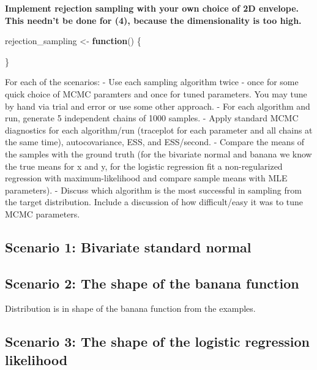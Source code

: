 \documentclass[
]{article}
\newenvironment{Shaded}{\begin{snugshade}}{\end{snugshade}}
\newcommand{\ControlFlowTok}[1]{\textcolor[rgb]{0.13,0.29,0.53}{\textbf{#1}}}
\newcommand{\NormalTok}[1]{#1}
\newcommand{\OtherTok}[1]{\textcolor[rgb]{0.56,0.35,0.01}{#1}}
\begin{document}
\textbf{Implement rejection sampling with your own choice of 2D
envelope. This needn't be done for (4), because the dimensionality is
too high.}

\begin{Shaded}
\begin{Highlighting}[]
\NormalTok{rejection\_sampling }\OtherTok{\textless{}{-}} \ControlFlowTok{function}\NormalTok{() \{}
  
\NormalTok{\}}
\end{Highlighting}
\end{Shaded}

For each of the scenarios: - Use each sampling algorithm twice - once
for some quick choice of MCMC paramters and once for tuned parameters.
You may tune by hand via trial and error or use some other approach. -
For each algorithm and run, generate 5 independent chains of 1000
samples. - Apply standard MCMC diagnostics for each algorithm/run
(traceplot for each parameter and all chains at the same time),
autocovariance, ESS, and ESS/second. - Compare the means of the samples
with the ground truth (for the bivariate normal and banana we know the
true means for x and y, for the logistic regression fit a
non-regularized regression with maximum-likelihood and compare sample
means with MLE parameters). - Discuss which algorithm is the most
successful in sampling from the target distribution. Include a
discussion of how difficult/easy it was to tune MCMC parameters.

\hypertarget{scenario-1-bivariate-standard-normal}{%
\subsection{Scenario 1: Bivariate standard
normal}\label{scenario-1-bivariate-standard-normal}}

\hypertarget{scenario-2-the-shape-of-the-banana-function}{%
\subsection{Scenario 2: The shape of the banana
function}\label{scenario-2-the-shape-of-the-banana-function}}

Distribution is in shape of the banana function from the examples.

\hypertarget{scenario-3-the-shape-of-the-logistic-regression-likelihood}{%
\subsection{Scenario 3: The shape of the logistic regression
likelihood}\label{scenario-3-the-shape-of-the-logistic-regression-likelihood}}
\end{document}
